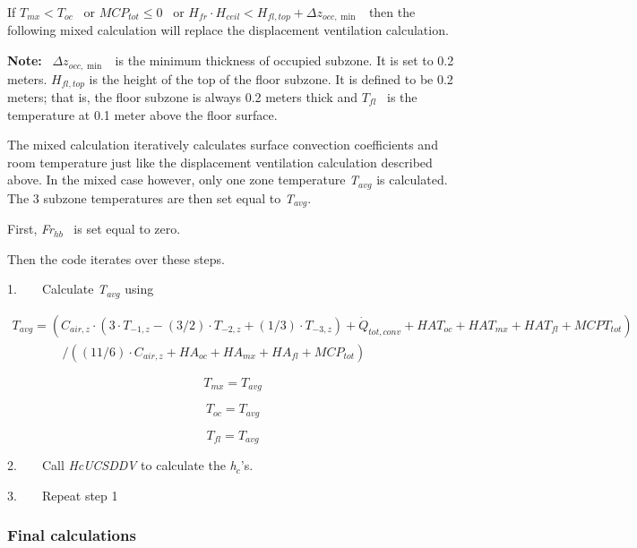If \({T_{mx}} < {T_{oc}}\) ~or \(MC{P_{tot}} \le 0\) ~or \({H_{fr}} \cdot {H_{ceil}} < {H_{fl,top}} + \Delta {z_{occ,\min }}\) ~then the following mixed calculation will replace the displacement ventilation calculation.

\textbf{Note:} ~\(\Delta {z_{occ,\min }}\) ~is the minimum thickness of occupied subzone. It is set to 0.2 meters. \({H_{fl,top}}\) is the height of the top of the floor subzone. It is defined to be 0.2 meters; that is, the floor subzone is always 0.2 meters thick and \({T_{fl}}\) ~is the temperature at 0.1 meter above the floor surface.

The mixed calculation iteratively calculates surface convection coefficients and room temperature just like the displacement ventilation calculation described above. In the mixed case however, only one zone temperature \emph{T\(_{avg}\)} is calculated. The 3 subzone temperatures are then set equal to \emph{T\(_{avg}\)}.

First, \emph{Fr\(_{hb}\)}~ is set equal to zero.

Then the code iterates over these steps.

1.~~~~Calculate \emph{T\(_{avg}\)} using

{\scriptsize
\begin{equation}
\begin{array}{l}
T_{avg} = (C_{air,z} \cdot (3 \cdot T_{ - 1,z} - (3/2) \cdot T_{ - 2,z} + (1/3) \cdot T_{ - 3,z}) + \dot Q_{tot,conv} + HAT_{oc} + HAT_{mx} + HAT_{fl} + MCPT_{tot}) \\
\quad \quad \quad \quad / ((11/6) \cdot C_{air,z} + HA_{oc} + HA_{mx} + HA_{fl} + MCP_{tot})
\end{array}
\end{equation}}

\begin{equation}
{T_{mx}} = {T_{avg}}
\end{equation}

\begin{equation}
{T_{oc}} = {T_{avg}}
\end{equation}

\begin{equation}
{T_{fl}} = {T_{avg}}
\end{equation}

2.~~~~Call \emph{HcUCSDDV} to calculate the \emph{h\(_{c}\)}'s.

3.~~~~Repeat step 1

\subsubsection{Final calculations}\label{final-calculations}

